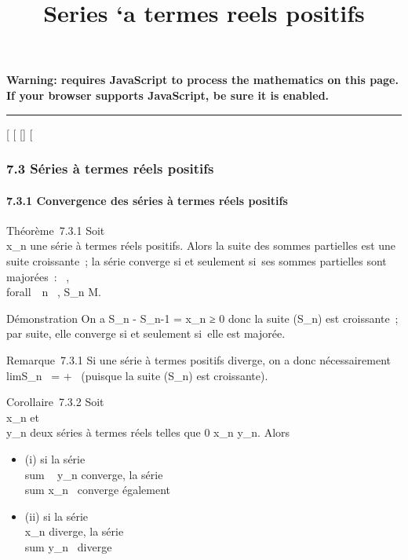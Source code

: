 \documentclass[]{article}
\title{Series `a termes reels positifs}
\author{}
\date{}
\begin{document}
\maketitle

\textbf{Warning: 
requires JavaScript to process the mathematics on this page.\\ If your
browser supports JavaScript, be sure it is enabled.}

\begin{center}\rule{3in}{0.4pt}\end{center}

[
[
[]
[

\subsubsection{7.3 Séries à termes réels positifs}

\paragraph{7.3.1 Convergence des séries à termes réels positifs}

Théorème~7.3.1 Soit \\\sum
 x_n une série à termes réels positifs. Alors la suite des
sommes partielles est une suite croissante~; la série converge si et
seulement si~ses sommes partielles sont majorées~:
\existsM \in {}~, \\forall~~n \in {}~,
S_n \leq M.

Démonstration On a S_n - S_n-1 = x_n ≥ 0 donc
la suite (S_n) est croissante~; par suite, elle converge si et
seulement si~elle est majorée.

Remarque~7.3.1 Si une série à termes positifs diverge, on a donc
nécessairement limS_n~ = +\infty~ (puisque
la suite (S_n) est croissante).

Corollaire~7.3.2 Soit \\\sum
 x_n et \\\sum
 y_n deux séries à termes réels telles que 0 \leq x_n
\leq y_n. Alors

\begin{itemize}
\itemsep1pt\parskip0pt
\item
  (i) si la série \\sum ~
  y_n converge, la série
  \\sum  x_n~
  converge également
\item
  (ii) si la série \\\sum
   x_n diverge, la série
  \\sum  y_n~
  diverge
\end{itemize}
\end{document}
